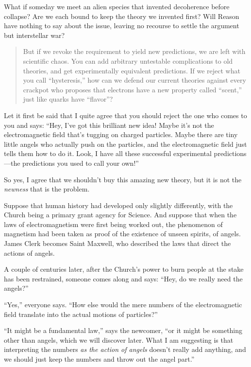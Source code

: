 {
 What if someday we meet an alien species that invented decoherence
before collapse? Are we each bound to keep the theory we invented
first? Will Reason have nothing to say about the issue, leaving no
recourse to settle the argument but interstellar war?}

\begin{quote}
{
 But if we revoke the requirement to yield new predictions, we are
left with scientific chaos. You can add arbitrary untestable
complications to old theories, and get experimentally equivalent
predictions. If we reject what you call
``hysteresis,'' how can we defend
our current theories against every crackpot who proposes that electrons
have a new property called
``scent,'' just like quarks have
``flavor''?}
\end{quote}

{
 Let it first be said that I quite agree that you should reject the
one who comes to you and says: ``Hey,
I've got this brilliant new idea! Maybe
it's not the electromagnetic field
that's tugging on charged particles. Maybe there are
tiny little angels who actually push on the particles, and the
electromagnetic field just tells them how to do it. Look, I have all
these successful experimental predictions---the predictions you used to
call your own!''}

{
 So yes, I agree that we shouldn't buy this amazing
new theory, but it is not the \textit{newness} that is the problem.}

{
 Suppose that human history had developed only slightly
differently, with the Church being a primary grant agency for Science.
And suppose that when the laws of electromagnetism were first being
worked out, the phenomenon of magnetism had been taken as proof of the
existence of unseen spirits, of angels. James Clerk becomes Saint
Maxwell, who described the laws that direct the actions of angels.}

{
 A couple of centuries later, after the Church's
power to burn people at the stake has been restrained, someone comes
along and says: ``Hey, do we really need the
angels?''}

{
 ``Yes,'' everyone says.
``How else would the mere numbers of the
electromagnetic field translate into the actual motions of
particles?''}

{
 ``It might be a fundamental
law,'' says the newcomer, ``or it
might be something other than angels, which we will discover later.
What I am suggesting is that interpreting the numbers \textit{as the
action of angels} doesn't really add anything, and we
should just keep the numbers and throw out the angel
part.''}


